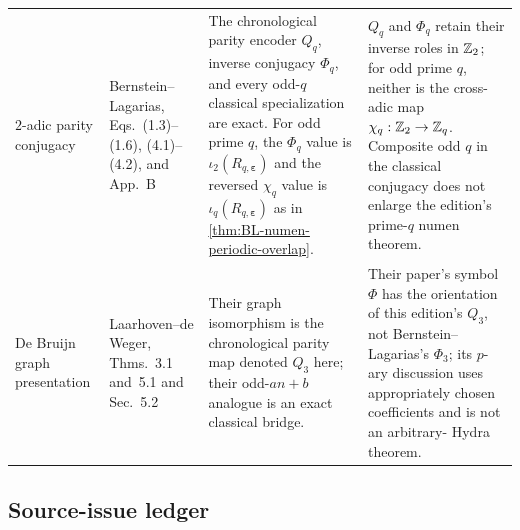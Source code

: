 \begin{longtable}{@{}p{}p{}p{}p{}@{}}
$2$-adic parity conjugacy & Bernstein--Lagarias, Eqs.~(1.3)--(1.6),
(4.1)--(4.2), and App.~B \cite{BernsteinLagarias} & The chronological parity
encoder $Q_q$, inverse conjugacy $\Phi_q$, and every odd-$q$ classical
specialization are exact.  For odd prime $q$, the $\Phi_q$ value is
$\iota_2(R_{q,\boldsymbol\varepsilon})$ and the reversed $\chi_q$ value is
$\iota_q(R_{q,\boldsymbol\varepsilon})$ as in
\cref{thm:BL-numen-periodic-overlap}. & $Q_q$ and
$\Phi_q$ retain their inverse roles in $\mathbb Z_2$; for odd prime $q$, neither is
the cross-adic map $\chi_q:\mathbb Z_2\to\mathbb Z_q$.  Composite odd $q$ in the classical conjugacy does not
enlarge the edition's prime-$q$ numen theorem.\\

De Bruijn graph presentation & Laarhoven--de Weger, Thms.~3.1 and~5.1 and
Sec.~5.2 \cite{LaarhovenDeWeger} & Their graph isomorphism is the
chronological parity map denoted $Q_3$ here; their odd-$an+b$ analogue is an
exact classical bridge. & Their paper's symbol $\Phi$ has the orientation of
this edition's $Q_3$, not Bernstein--Lagarias's $\Phi_3$; its $p$-ary
discussion uses appropriately chosen coefficients and is not an arbitrary-
Hydra theorem.\\
\bottomrule
\end{longtable}
\endgroup

\subsection{Source-issue ledger}

